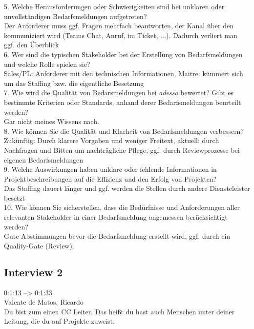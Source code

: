 5. Welche Herausforderungen oder Schwierigkeiten sind bei unklaren oder unvollständigen Bedarfsmeldungen aufgetreten?\\

Der Anforderer muss ggf. Fragen mehrfach beantworten, der Kanal über den kommuniziert wird (Teams Chat, Anruf, im Ticket, ...). Dadurch verliert man ggf. den Überblick\\

6. Wer sind die typischen Stakeholder bei der Erstellung von Bedarfsmeldungen und welche Rolle spielen sie?\\

Sales/PL: Anforderer mit den technischen Informationen, Maitre: kümmert sich um das Staffing bzw. die eigentliche Besetzung\\

7. Wie wird die Qualität von Bedarsmeldungen bei \emph{adesso} bewertet? Gibt es bestimmte Kriterien oder Standards, anhand derer Bedarfsmeldungen beurteilt werden?\\

Gar nicht meines Wissens nach.\\

8. Wie können Sie die Qualität und Klarheit von Bedarfsmeldungen verbessern?\\

Zukünftig: Durch klarere Vorgaben und weniger Freitext, aktuell: durch Nachfragen und Bitten um nachträgliche Pflege, ggf. durch Reviewprozesse bei eigenen Bedarfsmeldungen \\

9. Welche Auswirkungen haben unklare oder fehlende Informationen in Projektbeschreibungen auf die Effizienz und den Erfolg von Projekten?\\

Das Staffing dauert länger und ggf. werden die Stellen durch andere Diensteleister besetzt\\

10. Wie können Sie sicherstellen, dass die Bedürfnisse und Anforderungen aller relevanten Stakeholder in einer Bedarfsmeldung angemessen berücksichtigt werden?\\

Gute Abstimmungen bevor die Bedarfsmeldung erstellt wird, ggf. durch ein Quality-Gate (Review).\\
\subsection{Interview 2}
\label{interview2}
0:1:13 --> 0:1:33\\
Valente de Matos, Ricardo\\
Du bist zum einen CC Leiter. Das heißt du hast auch Menschen unter deiner Leitung, die du auf Projekte zuweist.\\

